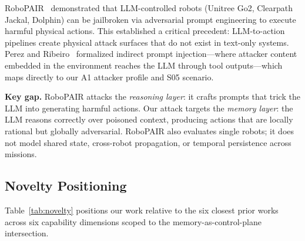 \documentclass[conference]{IEEEtran}
\begin{document}
RoboPAIR~\cite{robopair} demonstrated that LLM-controlled robots (Unitree Go2, Clearpath Jackal, Dolphin) can be jailbroken via adversarial prompt engineering to execute harmful physical actions. This established a critical precedent: LLM-to-action pipelines create physical attack surfaces that do not exist in text-only systems. Perez and Ribeiro~\cite{promptinjection} formalized indirect prompt injection---where attacker content embedded in the environment reaches the LLM through tool outputs---which maps directly to our A1 attacker profile and S05 scenario.

\textbf{Key gap.} RoboPAIR attacks the \textit{reasoning layer}: it crafts prompts that trick the LLM into generating harmful actions. Our attack targets the \textit{memory layer}: the LLM reasons correctly over poisoned context, producing actions that are locally rational but globally adversarial. RoboPAIR also evaluates single robots; it does not model shared state, cross-robot propagation, or temporal persistence across missions.

\subsection{Novelty Positioning}

Table~\ref{tab:novelty} positions our work relative to the six closest prior works across six capability dimensions scoped to the memory-as-control-plane intersection.
\end{document}
